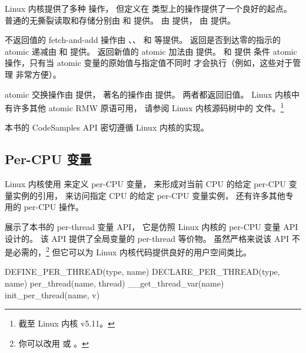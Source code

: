 Linux 内核提供了多种  操作，
但定义在  类型上的操作提供了一个良好的起点。
普通的无撕裂读取和存储分别由
 和  提供。
 由  提供，
 由  提供。

不返回值的 fetch-and-add 操作由
、、 和
 等提供。
返回是否到达零的指示的 atomic 递减由
 和  提供。
返回新值的 atomic 加法由  提供。
 和  提供
条件 atomic 操作，只有当 atomic 变量的原始值与指定值不同时
才会执行（例如，这些对于管理
非常方便）。

atomic 交换操作由  提供，
著名的操作由  提供。
两者都返回旧值。
Linux 内核中有许多其他 atomic RMW 原语可用，
请参阅 Linux 内核源码树中的
 文件。\footnote{
	截至 Linux 内核 v5.11。
}

本书的 CodeSamples API 密切遵循 Linux 内核的实现。

\subsection{Per-CPU 变量}
\label{sec:toolsoftrade:Per-CPU Variables}

Linux 内核使用  来定义 per-CPU 变量，
 来形成对当前 CPU 的给定 per-CPU 变量实例的引用，
 来访问指定 CPU 的给定 per-CPU 变量实例，
还有许多其他专用的 per-CPU 操作。

展示了本书的 per-thread 变量 API，
它是仿照 Linux 内核的 per-CPU 变量 API 设计的。
该 API 提供了全局变量的 per-thread 等价物。
虽然严格来说该 API 不是必需的，\footnote{
	你可以改用  或 。}
但它可以为 Linux 内核代码提供良好的用户空间类比。

\begin{listing}
\begin{VerbatimL}[numbers=none]
DEFINE_PER_THREAD(type, name)
DECLARE_PER_THREAD(type, name)
per_thread(name, thread)
__get_thread_var(name)
init_per_thread(name, v)
\end{VerbatimL}
\caption{Per-Thread 变量 API}
\label{lst:toolsoftrade:Per-Thread-Variable API}
\end{listing}

